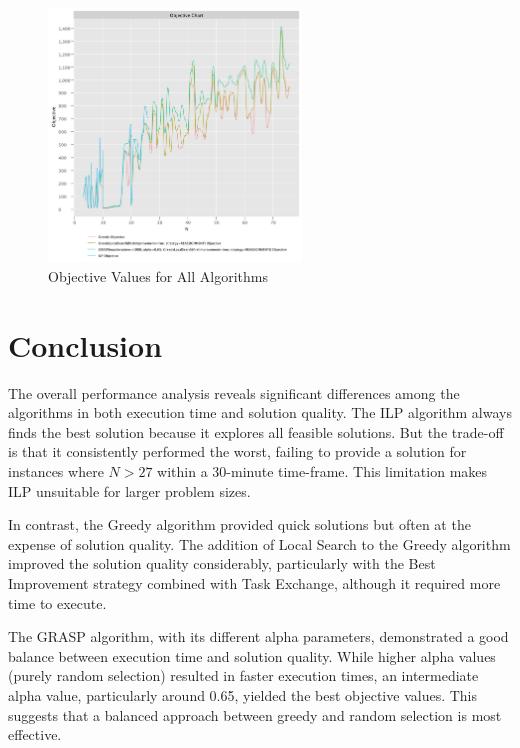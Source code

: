 \documentclass{article}
\begin{document}
\begin{figure}[!h]
    \centering
    \includegraphics[width=0.6\textwidth]{./documentation/assets/new.all.objectiveChart.pdf}
    \caption{Objective Values for All Algorithms}
    \label{fig:all_objective}
\end{figure}\FloatBarrier

\section{Conclusion}

The overall performance analysis reveals significant differences among the algorithms in both execution time and solution quality. The ILP algorithm always finds the best solution because it explores all feasible solutions. But the trade-off is that it consistently performed the worst, failing to provide a solution for instances where \( N > 27 \) within a 30-minute time-frame. This limitation makes ILP unsuitable for larger problem sizes.

In contrast, the Greedy algorithm provided quick solutions but often at the expense of solution quality. The addition of Local Search to the Greedy algorithm improved the solution quality considerably, particularly with the Best Improvement strategy combined with Task Exchange, although it required more time to execute.

The GRASP algorithm, with its different alpha parameters, demonstrated a good balance between execution time and solution quality. While higher alpha values (purely random selection) resulted in faster execution times, an intermediate alpha value, particularly around 0.65, yielded the best objective values. This suggests that a balanced approach between greedy and random selection is most effective.
\end{document}
